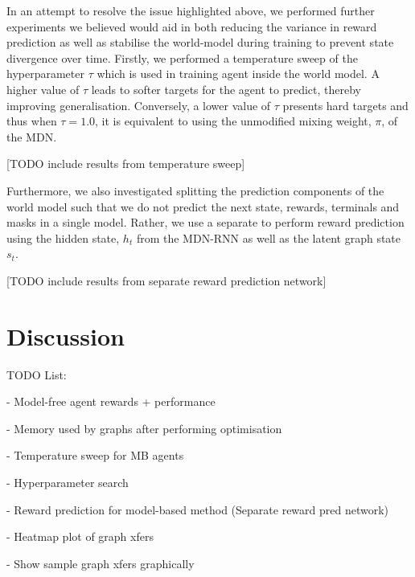 In an attempt to resolve the issue highlighted above, we performed further experiments we believed would aid in both reducing the variance in reward prediction as well as stabilise the world-model during training to prevent state divergence over time. Firstly, we performed a temperature sweep of the hyperparameter $\tau$ which is used in training agent inside the world model. A higher value of $\tau$ leads to softer targets for the agent to predict, thereby improving generalisation. Conversely, a lower value of $\tau$ presents hard targets and thus when $\tau = 1.0$, it is equivalent to using the unmodified mixing weight, $\pi$, of the MDN.   

[TODO include results from temperature sweep]

Furthermore, we also investigated splitting the prediction components of the world model such that we do not predict the next state, rewards, terminals and masks in a single model. Rather, we use a separate to perform reward prediction using the hidden state, $h_t$ from the MDN-RNN as well as the latent graph state $s_t$.

[TODO include results from separate reward prediction network]

\section{Discussion}

TODO List:

- Model-free agent rewards + performance

- Memory used by graphs after performing optimisation

- Temperature sweep for MB agents

- Hyperparameter search

- Reward prediction for model-based method (Separate reward pred network)

- Heatmap plot of graph xfers

- Show sample graph xfers graphically
